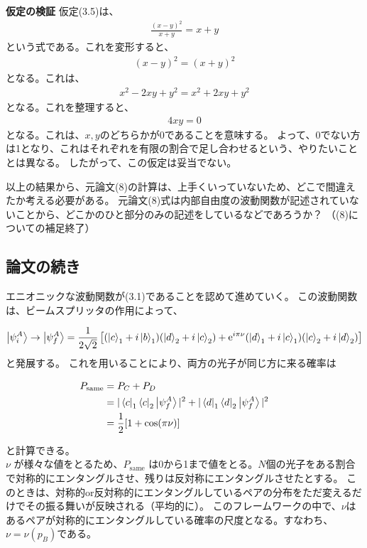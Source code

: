 \documentclass[a4paper,11pt]{jsarticle}
\numberwithin{equation}{section}
\begin{document}
\begin{itembox}[l]{\textbf{仮定の検証}}
  仮定(3.5)は、
  \begin{align}
    \frac{(x-y)^2}{x+y}=x+y
  \end{align}
  という式である。これを変形すると、
  \begin{align}
    (x-y)^2=(x+y)^2
  \end{align}
  となる。これは、
  \begin{align}
    x^2-2xy+y^2=x^2+2xy+y^2
  \end{align}
  となる。これを整理すると、
  \begin{align}
    4xy=0
  \end{align}
  となる。これは、$x,y$のどちらかが0であることを意味する。
  よって、0でない方は1となり、これはそれぞれを有限の割合で足し合わせるという、やりたいこととは異なる。
  したがって、この仮定は妥当でない。
\end{itembox}

以上の結果から、元論文(8)の計算は、上手くいっていないため、どこで間違えたか考える必要がある。
元論文(8)式は内部自由度の波動関数が記述されていないことから、どこかのひと部分のみの記述をしているなどであろうか？
（(8)についての補足終了）\\

\subsection{論文の続き}

エニオニックな波動関数が(3.1)であることを認めて進めていく。
この波動関数は、ビームスプリッタの作用によって、

\begin{align}
  \ket{\psi_i^A} \to \ket{\psi_f^A}=\frac{1}{2\sqrt{2}}\left[(\ket{c}_1+i\ket{b}_1)(\ket{d}_2+i\ket{c}_2)+\mathrm{e}^{i\pi\nu}(\ket{d}_1+i\ket{c}_1)(\ket{c}_2+i\ket{d}_2)\right]
\end{align}
と発展する。
これを用いることにより、両方の光子が同じ方に来る確率は

\begin{align}
  P_{\mathrm{same}} &= P_C+P_D \\
  &= |\bra{c}_1\bra{c}_2\ket{\psi_f^A}|^2+|\bra{d}_1\bra{d}_2\ket{\psi_f^A}|^2\\
  &=\frac{1}{2}[1+\cos(\pi \nu)] &&
\end{align}


と計算できる。\\
$\nu$ が様々な値をとるため、$P_{\mathrm{same}}$ は0から1まで値をとる。$N$個の光子をある割合で対称的にエンタングルさせ、残りは反対称にエンタングルさせたとする。
このときは、対称的or反対称的にエンタングルしているペアの分布をただ変えるだけでその振る舞いが反映される（平均的に）。
このフレームワークの中で、$\nu$はあるペアが対称的にエンタングルしている確率の尺度となる。すなわち、$\nu=\nu(p_B)$である。\\
\end{document}
